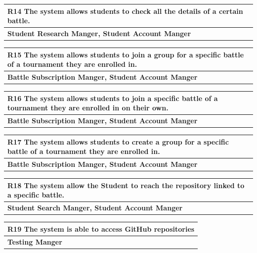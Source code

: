 \documentclass[12pt, a4paper]{report}
\begin{document}
\begin{table}[H]
    \begin{tabularx}{\textwidth}{X}
    \textbf{R14} The system allows students to check all the details of a certain battle.\\
    \hline 
    \textbf{Student Research Manger, Student Account Manger}
\end{tabularx}
\end{table}

\begin{table}[H]
    \begin{tabularx}{\textwidth}{X}
    \textbf{R15} The system allows students to join a group for a specific battle of a
    tournament they are enrolled in.\\
    \hline 
    \textbf{Battle Subscription Manger, Student Account Manger}
\end{tabularx}
\end{table}

\begin{table}[H]
    \begin{tabularx}{\textwidth}{X}
    \textbf{R16} The system allows students to join a specific battle of a tournament
    they are enrolled in on their own.\\
    \hline 
    \textbf{Battle Subscription Manger, Student Account Manger}
\end{tabularx}
\end{table}

\begin{table}[H]
    \begin{tabularx}{\textwidth}{X}
    \textbf{R17} The system allows students to create a group for a specific battle of a
    tournament they are enrolled in.\\
    \hline 
    \textbf{Battle Subscription Manger, Student Account Manger}
\end{tabularx}
\end{table}

\begin{table}[H]
    \begin{tabularx}{\textwidth}{X}
    \textbf{R18} The system allow the Student to reach the repository linked to a specific
    battle.\\
    \hline 
    \textbf{Student Search Manger, Student Account Manger}
\end{tabularx}
\end{table}

\begin{table}[H]
    \begin{tabularx}{\textwidth}{X}
    \textbf{R19} The system is able to access GitHub repositories\\
    \hline 
    \textbf{Testing Manger}
\end{tabularx}
\end{table}
\end{document}
